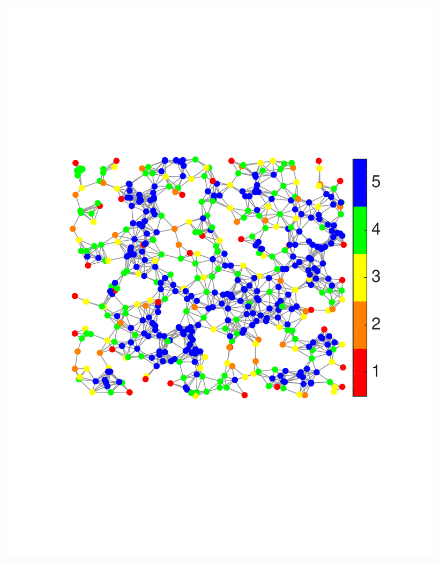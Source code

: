 \documentclass{article}
\begin{document}
\begin{figure}[tb]
\begin{minipage}[m]{0.438\linewidth}
\centerline{\includegraphics[width=.98\linewidth]{fig_uniq_part_sensor3}}
\end{minipage}
\hspace{.003\linewidth}
\begin{minipage}[m]{0.05\linewidth}

\end{minipage}
\end{figure}
\end{document}
